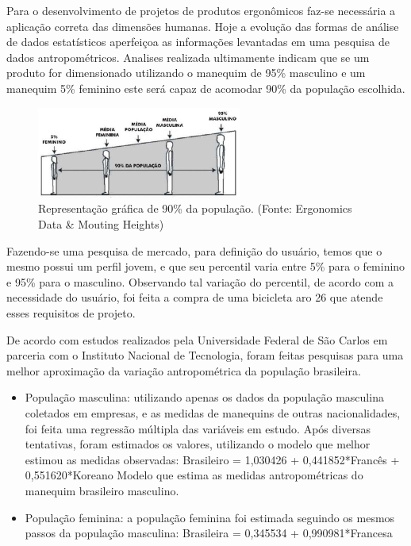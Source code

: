 Para o desenvolvimento de projetos de produtos ergonômicos faz-se necessária a aplicação correta das dimensões humanas. Hoje a evolução das formas de análise de dados estatísticos aperfeiçoa as informações levantadas em uma pesquisa de dados antropométricos. Analises realizada ultimamente indicam que se um produto for dimensionado utilizando o manequim de 95\%  masculino e um manequim 5\% feminino este será capaz de acomodar 90\% da população escolhida. 

\begin{figure}
  \centering
  \includegraphics[width=0.6\textwidth]{figuras/media}
  \caption{Representação gráfica de 90\% da população. (Fonte: Ergonomics Data \& Mouting Heights)}
\end{figure}

Fazendo-se uma pesquisa de mercado, para definição do usuário, temos que o mesmo possui um perfil jovem, e que seu percentil varia entre 5\% para o feminino e 95\% para o masculino. Observando tal variação do percentil, de acordo com a necessidade do usuário, foi feita a compra de uma bicicleta aro 26 que atende esses requisitos de projeto.

De acordo com estudos realizados pela Universidade Federal de São Carlos em parceria com o Instituto Nacional de Tecnologia, foram feitas pesquisas para uma melhor aproximação da variação antropométrica da população brasileira. 

\begin{itemize}

  \item População masculina: utilizando apenas os dados da população masculina coletados em empresas, e as medidas de manequins de outras nacionalidades, foi feita uma regressão múltipla  das variáveis em estudo. Após diversas tentativas, foram estimados os valores, utilizando o modelo que melhor estimou as medidas observadas:
  Brasileiro = 1,030426 + 0,441852*Francês + 0,551620*Koreano
Modelo que estima as medidas antropométricas do manequim brasileiro masculino.

  \item População feminina: a população feminina foi estimada seguindo os mesmos passos da população masculina:
    Brasileira = 0,345534 + 0,990981*Francesa
\end{itemize}


